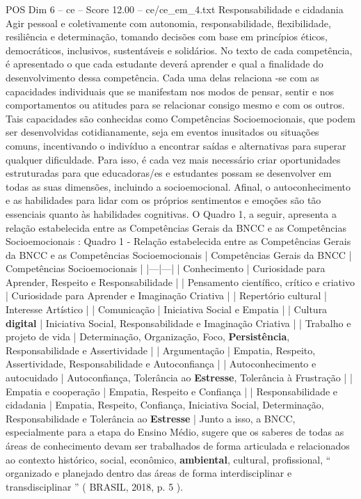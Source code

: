 \begin{textsample}{POS Dim 6 – ce – Score 12.00 – ce/ce\_em\_4.txt}
Responsabilidade e cidadania Agir pessoal e coletivamente com autonomia, responsabilidade, flexibilidade, resiliência e determinação, tomando decisões com base em princípios éticos, democráticos, inclusivos, sustentáveis e solidários.
No texto de cada competência, é apresentado o que cada estudante deverá aprender e qual a finalidade do desenvolvimento dessa competência.
Cada uma delas relaciona -se com as capacidades individuais que se manifestam nos modos de pensar, sentir e nos comportamentos ou atitudes para se relacionar consigo mesmo e com os outros.
Tais capacidades são conhecidas como Competências Socioemocionais, que podem ser desenvolvidas cotidianamente, seja em eventos inusitados ou situações comuns, incentivando o indivíduo a encontrar saídas e alternativas para superar qualquer dificuldade.
Para isso, é cada vez mais necessário criar oportunidades estruturadas para que educadoras/es e estudantes possam se desenvolver em todas as suas dimensões, incluindo a socioemocional.
Afinal, o autoconhecimento e as habilidades para lidar com os próprios sentimentos e emoções são tão essenciais quanto às habilidades cognitivas.
O Quadro 1, a seguir, apresenta a relação estabelecida entre as Competências Gerais da BNCC e as Competências Socioemocionais : Quadro 1 - Relação estabelecida entre as Competências Gerais da BNCC e as Competências Socioemocionais | Competências Gerais da BNCC | Competências Socioemocionais | |---|---| | Conhecimento | Curiosidade para Aprender, Respeito e Responsabilidade | | Pensamento científico, crítico e criativo | Curiosidade para Aprender e Imaginação Criativa | | Repertório cultural | Interesse Artístico | | Comunicação | Iniciativa Social e Empatia | | Cultura \textbf{digital} | Iniciativa Social, Responsabilidade e Imaginação Criativa | | Trabalho e projeto de vida | Determinação, Organização, Foco, \textbf{Persistência}, Responsabilidade e Assertividade | | Argumentação | Empatia, Respeito, Assertividade, Responsabilidade e Autoconfiança | | Autoconhecimento e autocuidado | Autoconfiança, Tolerância ao \textbf{Estresse}, Tolerância à Frustração | | Empatia e cooperação | Empatia, Respeito e Confiança | | Responsabilidade e cidadania | Empatia, Respeito, Confiança, Iniciativa Social, Determinação, Responsabilidade e Tolerância ao \textbf{Estresse} | Junto a isso, a BNCC, especialmente para a etapa do Ensino Médio, sugere que os saberes de todas as áreas de conhecimento devam ser trabalhados de forma articulada e relacionados ao contexto histórico, social, econômico, \textbf{ambiental}, cultural, profissional, “ organizado e planejado dentro das áreas de forma interdisciplinar e transdisciplinar ” ( BRASIL, 2018, p. 5 ).

\end{textsample}
